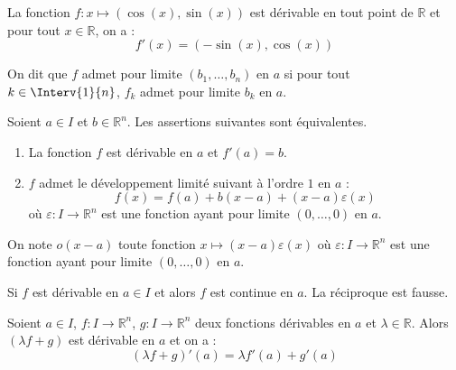\documentclass[a4paper,10pt]{report}
\begin{document}

\begin{ex} La fonction $f : x \mapsto (\cos(x), \sin(x))$ est dérivable en tout point de $\mathbb{R}$ et pour tout $x \in \mathbb{R}$, on a :
$$ f'(x) = (- \sin(x), \cos(x))$$
\end{ex}

\begin{rem} On dit que $f$ admet pour limite $(b_1, \ldots, b_n)$ en $a$ si pour tout $k \in \Interv{1}{n}$, $f_k$ admet pour limite $b_k$ en $a$.
\end{rem}

\begin{prop} Soient $a \in I$ et $b \in \mathbb{R}^n$. Les assertions suivantes sont équivalentes.

\begin{enumerate}
\item La fonction $f$ est dérivable en $a$ et $f'(a)=b$.
\item $f$ admet le développement limité suivant à l'ordre $1$ en $a$ :
$$ f(x) = f(a)+ b(x-a) + (x-a) \varepsilon(x)$$
où $\varepsilon : I \rightarrow \mathbb{R}^n$ est une fonction ayant pour limite $(0, \ldots, 0)$ en $a$.
\end{enumerate}
\end{prop}

\begin{rem} On note $o(x-a)$ toute fonction $x \mapsto (x-a)\varepsilon(x)$ où $\varepsilon : I \rightarrow \mathbb{R}^n$ est une fonction ayant pour limite $(0, \ldots, 0)$ en $a$.
\end{rem}

\begin{cor} Si $f$ est dérivable en $a \in I$ et alors $f$ est continue en $a$. La réciproque est fausse.
\end{cor}


\begin{prop} Soient $a \in I$, $f : I \rightarrow \mathbb{R}^n$, $g : I \rightarrow \mathbb{R}^n$ deux fonctions dérivables en $a$ et $\lambda \in \mathbb{R}$. Alors $(\lambda f+g)$ est dérivable en $a$ et on a :
$$ (\lambda f+g)'(a) = \lambda f'(a) + g'(a) $$
\end{prop}
\end{document}
